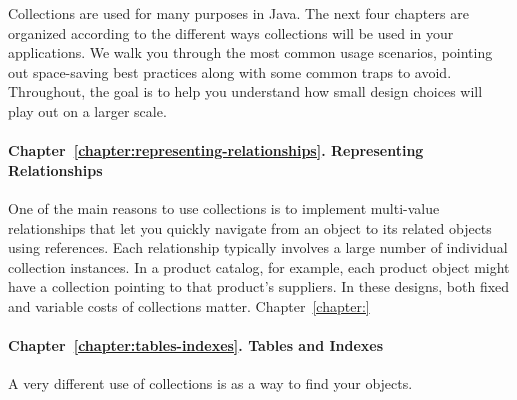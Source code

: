 Collections are used for many purposes in Java.  The next four chapters are
organized according to the different ways collections will be used in your
applications. We walk you through the most common usage scenarios, pointing out
space-saving best practices along with some common traps to avoid. 
Throughout, the goal is to help you understand how small design choices
will play out on a larger scale.


\paragraph{Chapter~\ref{chapter:representing-relationships}. Representing
Relationships} One of the main reasons to use collections is to implement
multi-value relationships that let you quickly navigate from an object to its
related objects using references. Each relationship typically involves a large number of individual collection instances.  In a
product catalog, for example, each product object might have a collection
pointing to that product's suppliers. In these designs, both fixed and variable costs of collections matter. Chapter~\ref{chapter:}

\paragraph{Chapter~\ref{chapter:tables-indexes}. Tables and Indexes} A very
different use of collections is as a way to find your objects. 

